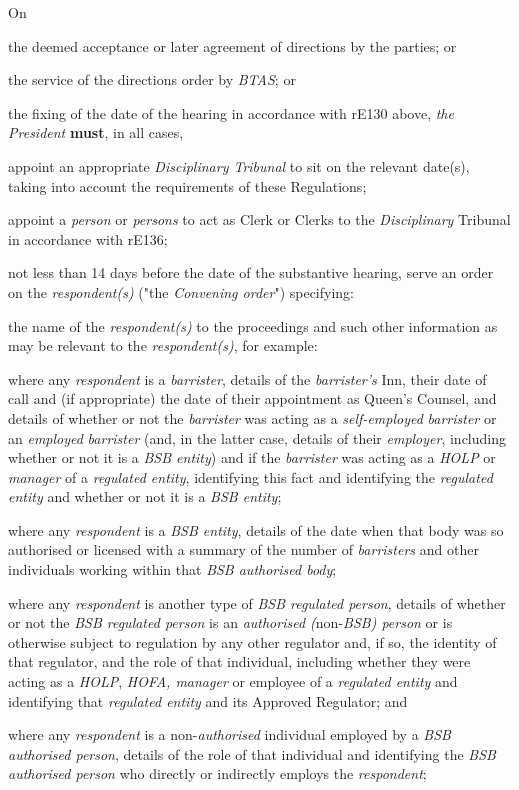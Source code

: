 On\\\nl \item the deemed acceptance or later agreement of directions by the
parties; or\item the service of the directions order by \emph{BTAS}; or\item the fixing of the date of the hearing in accordance with rE130
above,\ln
\emph{the President}  \textcolor{myred}{\textbf{must}}, in all cases,\\
\al \item appoint an appropriate \emph{Disciplinary Tribunal} to sit on the
relevant date(s), taking into account the requirements of these
Regulations;\\
\item appoint a \emph{person} or \emph{persons} to act as Clerk or Clerks
to the \emph{Disciplinary }Tribunal in accordance with rE136;\\
\item not less than 14 days before the date of the substantive hearing,
serve an order on the \emph{respondent(s)} ("the \emph{Convening
order}") specifying:\\
\rl  \item the name of the \emph{respondent(s)} to the proceedings and such
other information as may be relevant to the \emph{respondent(s)}, for
example:
\nl \item where any \emph{respondent} is a \emph{barrister}, details of the \emph{barrister's} Inn, their date of call and (if appropriate) the date of their appointment as Queen's Counsel, and details of whether or not the \emph{barrister} was acting as a \emph{self-employed} \emph{barrister} or an\emph{ employed} \emph{barrister} (and, in the latter case, details of their \emph{employer}, including whether or not it is a \emph{BSB entity}) and if the \emph{barrister} was acting as a \emph{HOLP} or \emph{manager} of a \emph{regulated entity}, identifying this fact and identifying the \emph{regulated entity} and whether or not it is a \emph{BSB entity};\item where any \emph{respondent} is a \emph{BSB entity}, details of the date when that body was so authorised or licensed with a summary of the number of \emph{barristers} and other individuals working within that \emph{BSB authorised body};
\item where any \emph{respondent} is another type of \emph{BSB regulated
person}, details of whether or not the \emph{BSB regulated person} is
an \emph{authorised (}non-\emph{BSB) person} or is otherwise subject to
regulation by any other regulator and, if so, the identity of that
regulator, and the role of that individual, including whether they were
acting as a \emph{HOLP}, \emph{HOFA, manager} or employee of
a \emph{regulated entity} and identifying that \emph{regulated
entity }and its Approved Regulator; and
\item where any \emph{respondent} is a non-\emph{authorised }individual
employed by a \emph{BSB authorised person}, details of the role of  that
individual and identifying the \emph{BSB authorised person} who directly
or indirectly employs the \emph{respondent};
\rl  \setcounter{enumi}{1}

